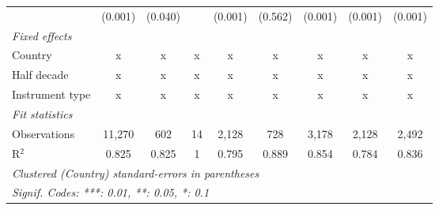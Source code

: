 \begin{table}[htbp]
\begin{tabular}{lcccccccc}
                                                                      & (0.001)       & (0.040)                   &              & (0.001)        & (0.562)          & (0.001)         & (0.001)         & (0.001)\\   
      \emph{Fixed effects}\\
      Country                                                         & x             & x                         & x            & x              & x                & x               & x               & x\\  
      Half decade                                                     & x             & x                         & x            & x              & x                & x               & x               & x\\  
      Instrument type                                                 & x             & x                         & x            & x              & x                & x               & x               & x\\  
      \midrule \emph{Fit statistics}\\
      Observations                                                    & 11,270        & 602                       & 14           & 2,128          & 728              & 3,178           & 2,128           & 2,492\\  
      R$^2$                                                           & 0.825         & 0.825                     & 1            & 0.795          & 0.889            & 0.854           & 0.784           & 0.836\\  
      \midrule
      \multicolumn{9}{l}{\emph{Clustered (Country) standard-errors in parentheses}}\\
      \multicolumn{9}{l}{\emph{Signif. Codes: ***: 0.01, **: 0.05, *: 0.1}}\\
   \end{tabular}
\end{table}


